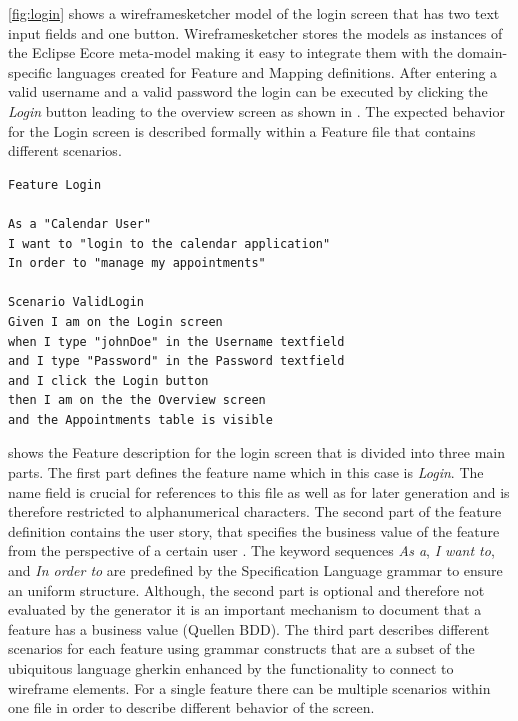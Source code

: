 \documentclass{sig-alternate-05-2015}
\begin{document}
\cref{fig:login} shows a wireframesketcher model of the login screen that has two text input fields and one button.
Wireframesketcher stores the models as instances of the Eclipse Ecore meta-model making it easy to integrate them with the domain-specific languages created for Feature and Mapping definitions.
After entering a valid username and a valid password the login can be executed by clicking the \textit{Login} button leading to the overview screen as shown in .
The expected behavior for the Login screen is described formally within a Feature file that contains different scenarios.

\begin{lstlisting}[captionpos=b, caption=Feature Description: Login Screen., label={lst:featureLogin}, language=dsl]
Feature Login

As a "Calendar User"
I want to "login to the calendar application"
In order to "manage my appointments"

Scenario ValidLogin
Given I am on the Login screen 
when I type "johnDoe" in the Username textfield 
and I type "Password" in the Password textfield 
and I click the Login button
then I am on the the Overview screen
and the Appointments table is visible
\end{lstlisting}

 shows the Feature description for the login screen that is divided into three main parts. 
The first part defines the feature name which in this case is \textit{Login}.
The name field is crucial for references to this file as well as for later generation and is therefore restricted to alphanumerical characters.
The second part of the feature definition contains the user story, that specifies the business value of the feature from the perspective of a certain user \cite{C.Solis.2011}.
The keyword sequences \textit{As a}, \textit{I want to}, and \textit{In order to} are predefined by the Specification Language grammar to ensure an uniform structure.
Although, the second part is optional and therefore not evaluated by the generator it is an important mechanism to document that a feature has a business value (Quellen BDD).
The third part describes different scenarios for each feature using grammar constructs that are a subset of the ubiquitous language gherkin enhanced by the functionality to connect to wireframe elements.
For a single feature there can be multiple scenarios within one file in order to describe different behavior of the screen.
\end{document}
